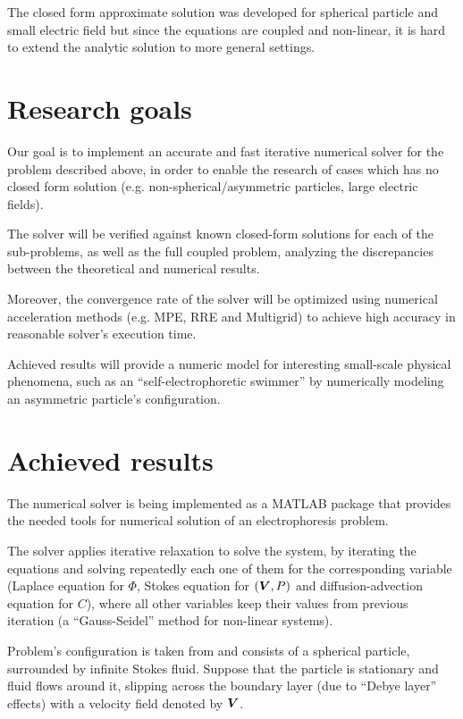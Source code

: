 \documentclass[11pt]{article}
\begin{document}
The closed form approximate solution was developed for spherical particle
and small electric field \cite{Yariv10} but since the equations are coupled
and non-linear, it is hard to extend the analytic solution to more general
settings.

\section{Research goals}
Our goal is to implement an accurate and fast iterative numerical
solver for the problem described above,
in order to enable the research of cases which has no closed form solution
(e.g. non-spherical/asymmetric particles, large electric fields).

The solver will be verified against known closed-form solutions
for each of the sub-problems, as well as the full coupled problem,
analyzing the discrepancies between the theoretical and numerical results.

Moreover, the convergence rate of the solver will be optimized using
numerical acceleration methods (e.g. MPE, RRE and Multigrid) to achieve
high accuracy in reasonable solver's execution time.

Achieved results will provide a numeric model for interesting small-scale physical phenomena,
such as an ``self-electrophoretic swimmer'' by numerically modeling an asymmetric particle's configuration.

\section{Achieved results}
The numerical solver is being implemented as a MATLAB package that
provides the needed tools for numerical solution of an electrophoresis problem.

The solver applies iterative relaxation to solve the system, by
iterating the equations and solving repeatedly each one of them
for the corresponding variable
(Laplace equation for $\varPhi$, Stokes equation for $(\boldsymbol{V}, P)$
and diffusion-advection equation for $C$), where
all other variables keep their values from previous iteration
(a ``Gauss-Seidel'' method for non-linear systems).

Problem's configuration is taken from \cite{Yariv10} and
consists of a spherical particle, surrounded by infinite Stokes fluid.
Suppose that the particle is stationary and fluid flows around it, slipping across
the boundary layer (due to ``Debye layer'' effects) with a velocity field denoted
by $\boldsymbol{V}$.
\end{document}
